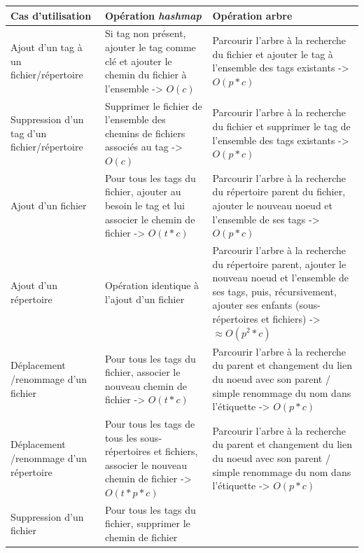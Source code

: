 \documentclass[a4paper, 12pt]{article}
\begin{document}
\begin{center}
    \begin{tabularx}{16.5cm}{|p{3cm}|X|X|} \hline
        \textbf{Cas d'utilisation} & \textbf{Opération \textit{hashmap}} & \textbf{Opération arbre} \\ \hline
        Ajout d'un tag à un fichier/répertoire & Si tag non présent, ajouter le tag comme clé et 
            ajouter le chemin du fichier à l'ensemble -> $O(c)$ & Parcourir l'arbre à la recherche 
            du fichier et ajouter le tag à l'ensemble des tags existants -> $O(p * c)$ \\ \hline
        Suppression d'un tag d'un fichier/répertoire & Supprimer le fichier de l'ensemble des 
            chemins de fichiers associés au tag -> $O(c)$ & Parcourir l'arbre à la recherche 
            du fichier et supprimer le tag de l'ensemble des tags existants -> $O(p * c)$ \\ \hline
        Ajout d'un fichier & Pour tous les tags du fichier, ajouter au besoin le tag et lui 
            associer le chemin de fichier -> $O(t * c)$ & Parcourir l'arbre à 
            la recherche du répertoire parent du fichier, ajouter le nouveau noeud et l'ensemble 
            de ses tags -> $O(p * c)$ \\ \hline
        Ajout d'un répertoire & Opération identique à l'ajout d'un fichier & Parcourir l'arbre à 
            la recherche du répertoire parent, ajouter le nouveau noeud et l'ensemble 
            de ses tags, puis, récursivement, ajouter ses enfants (sous-répertoires et fichiers) 
            -> $\approx O(p^2 * c)$ \\ \hline
        Déplacement /renommage d'un fichier & Pour tous les tags du fichier, associer le nouveau 
            chemin de fichier -> $O(t * c)$ & Parcourir l'arbre à la recherche du parent et 
            changement du lien du noeud avec son parent / simple renommage du nom dans 
            l'étiquette -> $O(p * c)$ \\ \hline
        Déplacement /renommage d'un répertoire & Pour tous les tags de tous les 
            sous-répertoires et fichiers, associer le nouveau chemin de fichier -> $O(t * p * c)$ 
            & Parcourir l'arbre à la recherche du parent et changement du lien du noeud avec son 
            parent / simple renommage du nom dans l'étiquette -> $O(p * c)$ \\ \hline
        Suppression d'un fichier & Pour tous les tags du fichier, supprimer le chemin de fichier 

\end{tabularx}
\end{center}
\end{document}
